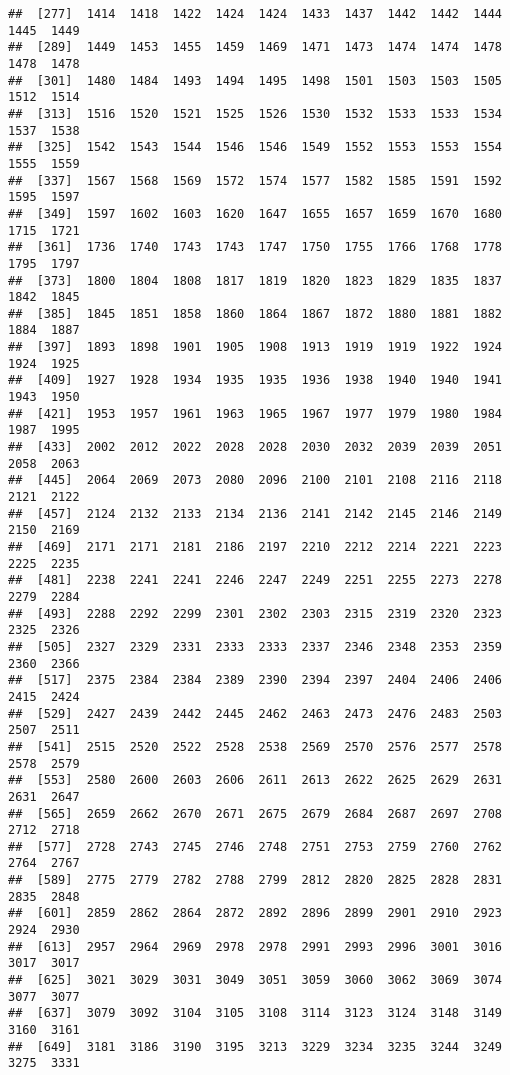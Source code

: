 \documentclass[
]{article}
\begin{document}
\begin{verbatim}
##  [277]  1414  1418  1422  1424  1424  1433  1437  1442  1442  1444  1445  1449
##  [289]  1449  1453  1455  1459  1469  1471  1473  1474  1474  1478  1478  1478
##  [301]  1480  1484  1493  1494  1495  1498  1501  1503  1503  1505  1512  1514
##  [313]  1516  1520  1521  1525  1526  1530  1532  1533  1533  1534  1537  1538
##  [325]  1542  1543  1544  1546  1546  1549  1552  1553  1553  1554  1555  1559
##  [337]  1567  1568  1569  1572  1574  1577  1582  1585  1591  1592  1595  1597
##  [349]  1597  1602  1603  1620  1647  1655  1657  1659  1670  1680  1715  1721
##  [361]  1736  1740  1743  1743  1747  1750  1755  1766  1768  1778  1795  1797
##  [373]  1800  1804  1808  1817  1819  1820  1823  1829  1835  1837  1842  1845
##  [385]  1845  1851  1858  1860  1864  1867  1872  1880  1881  1882  1884  1887
##  [397]  1893  1898  1901  1905  1908  1913  1919  1919  1922  1924  1924  1925
##  [409]  1927  1928  1934  1935  1935  1936  1938  1940  1940  1941  1943  1950
##  [421]  1953  1957  1961  1963  1965  1967  1977  1979  1980  1984  1987  1995
##  [433]  2002  2012  2022  2028  2028  2030  2032  2039  2039  2051  2058  2063
##  [445]  2064  2069  2073  2080  2096  2100  2101  2108  2116  2118  2121  2122
##  [457]  2124  2132  2133  2134  2136  2141  2142  2145  2146  2149  2150  2169
##  [469]  2171  2171  2181  2186  2197  2210  2212  2214  2221  2223  2225  2235
##  [481]  2238  2241  2241  2246  2247  2249  2251  2255  2273  2278  2279  2284
##  [493]  2288  2292  2299  2301  2302  2303  2315  2319  2320  2323  2325  2326
##  [505]  2327  2329  2331  2333  2333  2337  2346  2348  2353  2359  2360  2366
##  [517]  2375  2384  2384  2389  2390  2394  2397  2404  2406  2406  2415  2424
##  [529]  2427  2439  2442  2445  2462  2463  2473  2476  2483  2503  2507  2511
##  [541]  2515  2520  2522  2528  2538  2569  2570  2576  2577  2578  2578  2579
##  [553]  2580  2600  2603  2606  2611  2613  2622  2625  2629  2631  2631  2647
##  [565]  2659  2662  2670  2671  2675  2679  2684  2687  2697  2708  2712  2718
##  [577]  2728  2743  2745  2746  2748  2751  2753  2759  2760  2762  2764  2767
##  [589]  2775  2779  2782  2788  2799  2812  2820  2825  2828  2831  2835  2848
##  [601]  2859  2862  2864  2872  2892  2896  2899  2901  2910  2923  2924  2930
##  [613]  2957  2964  2969  2978  2978  2991  2993  2996  3001  3016  3017  3017
##  [625]  3021  3029  3031  3049  3051  3059  3060  3062  3069  3074  3077  3077
##  [637]  3079  3092  3104  3105  3108  3114  3123  3124  3148  3149  3160  3161
##  [649]  3181  3186  3190  3195  3213  3229  3234  3235  3244  3249  3275  3331

\end{verbatim}
\end{document}
